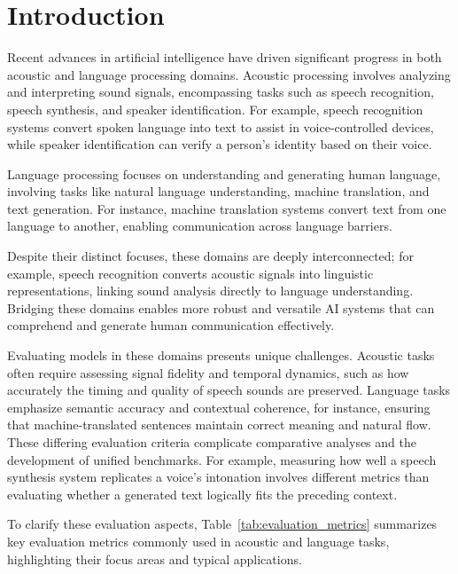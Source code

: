 \documentclass[sigconf]{acmart}
\begin{document}
\maketitle

\section{Introduction}

Recent advances in artificial intelligence have driven significant progress in both acoustic and language processing domains. Acoustic processing involves analyzing and interpreting sound signals, encompassing tasks such as speech recognition, speech synthesis, and speaker identification. For example, speech recognition systems convert spoken language into text to assist in voice-controlled devices, while speaker identification can verify a person's identity based on their voice.

Language processing focuses on understanding and generating human language, involving tasks like natural language understanding, machine translation, and text generation. For instance, machine translation systems convert text from one language to another, enabling communication across language barriers.

Despite their distinct focuses, these domains are deeply interconnected; for example, speech recognition converts acoustic signals into linguistic representations, linking sound analysis directly to language understanding. Bridging these domains enables more robust and versatile AI systems that can comprehend and generate human communication effectively.

Evaluating models in these domains presents unique challenges. Acoustic tasks often require assessing signal fidelity and temporal dynamics, such as how accurately the timing and quality of speech sounds are preserved. Language tasks emphasize semantic accuracy and contextual coherence, for instance, ensuring that machine-translated sentences maintain correct meaning and natural flow. These differing evaluation criteria complicate comparative analyses and the development of unified benchmarks. For example, measuring how well a speech synthesis system replicates a voice’s intonation involves different metrics than evaluating whether a generated text logically fits the preceding context.

To clarify these evaluation aspects, Table~\ref{tab:evaluation_metrics} summarizes key evaluation metrics commonly used in acoustic and language tasks, highlighting their focus areas and typical applications.
\end{document}
